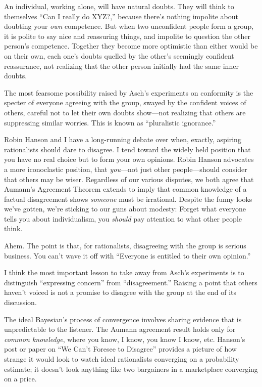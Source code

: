 {
 An individual, working alone, will have natural doubts. They will
think to themselves ``Can I really do
XYZ?,'' because there's nothing
impolite about doubting your \textit{own} competence. But when two
unconfident people form a group, it is polite to say nice and
reassuring things, and impolite to question the other
person's competence. Together they become more
optimistic than either would be on their own, each
one's doubts quelled by the other's
seemingly confident reassurance, not realizing that the other person
initially had the same inner doubts.}

{
 The most fearsome possibility raised by Asch's
experiments on conformity is the specter of everyone agreeing with the
group, swayed by the confident voices of others, careful not to let
their own doubts show---not realizing that others are suppressing
similar worries. This is known as ``pluralistic
ignorance.''}

{
 Robin Hanson and I have a long-running debate over when, exactly,
aspiring rationalists should dare to disagree. I tend toward the widely
held position that you have no real choice but to form your own
opinions. Robin Hanson advocates a more iconoclastic position, that
\textit{you}{}---not just other people---should consider that others
may be wiser. Regardless of our various disputes, we both agree that
Aumann's Agreement Theorem extends to imply that common
knowledge of a factual disagreement shows \textit{someone} must be
irrational. Despite the funny looks we've gotten,
we're sticking to our guns about modesty: Forget what
everyone tells you about individualism, you \textit{should} pay
attention to what other people think.}

{
 Ahem. The point is that, for rationalists, disagreeing with the
group is serious business. You can't wave it off with
``Everyone is entitled to their own
opinion.''}

{
 I think the most important lesson to take away from
Asch's experiments is to distinguish
``expressing concern'' from
``disagreement.'' Raising a point
that others haven't voiced is not a promise to disagree
with the group at the end of its discussion.}

{
 The ideal Bayesian's process of convergence
involves sharing evidence that is unpredictable to the listener. The
Aumann agreement result holds only for \textit{common knowledge}, where
you know, I know, you know I know, etc. Hanson's post
or paper on ``We Can't Foresee to
Disagree'' provides a picture of how strange it would
look to watch ideal rationalists converging on a probability estimate;
it doesn't look anything like two bargainers in a
marketplace converging on a price.}


